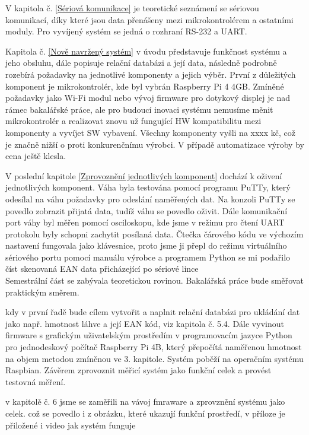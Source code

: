 V kapitola č. \ref{Sériová komunikace} je teoretické seznámení se sériovou komunikací, díky které jsou data přenášeny mezi mikrokontrolérem a ostatními moduly. Pro vyvíjený systém se jedná o rozhraní RS-232 a UART.

Kapitola č. \ref{Nově navržený systém} v úvodu představuje funkčnost systému a jeho obsluhu, dále popisuje relační databázi a její data, následně podrobně rozebírá požadavky na jednotlivé komponenty a jejich výběr. První z důležitých komponent je mikrokontrolér, kde byl vybrán Raspberry Pi 4 4GB. Zmíněné požadavky jako Wi-Fi modul nebo vývoj firmware pro dotykový displej je nad rámec bakalářské práce, ale pro budoucí inovaci systému nemusíme měnit mikrokontrolér a realizovat znovu už fungující HW kompatibilitu mezi komponenty a vyvíjet SW vybavení.
Všechny komponenty vyšli na xxxx kč, což je značně nižší o proti konkurenčnímu výrobci. V případě automatizace výroby by cena ještě klesla.

V poslední kapitole \ref{Zprovoznění jednotlivých komponent} dochází k oživení jednotlivých komponent. Váha byla testována pomocí programu PuTTy, který odesílal na váhu požadavky pro odeslání naměřených dat. Na konzoli PuTTy se povedlo zobrazit přijatá data, tudíž váhu se povedlo oživit. Dále komunikační port váhy byl měřen pomocí osciloskopu, kde jsme v režimu pro čtení UART protokolu byly schopni zachytit posílaná data. Čtečka čárového kódu ve výchozím nastavení fungovala jako klávesnice, proto jsme ji přepl do režimu virtuálního sériového portu pomocí manuálu výrobce a programem Python se mi podařilo číst skenovaná EAN data přicházející po sériové lince\\
Semestrální část se zabývala teoretickou rovinou. Bakalářská práce bude směřovat praktickým směrem. 

kdy v první řadě bude cílem vytvořit a naplnit relační databázi pro ukládání dat jako např. hmotnost láhve a její EAN kód, viz kapitola č. 5.4. Dále vyvinout firmware s grafickým uživatelským prostředím v programovacím jazyce Python pro jednodeskový počítač Raspberry Pi 4B, který přepočítá naměřenou hmotnost na objem metodou zmíněnou ve 3. kapitole. Systém poběží na operačním systému Raspbian. Závěrem zprovoznit měřicí systém jako funkční celek a provést testovná měření. 

v kapitolě č. 6 jsme se zaměřili na vávoj fmraware a zprovznění systému jako celek. což se povedlo i z obrázku, které ukazují funkční prostředí, v příloze je přiložené i video jak systém funguje


